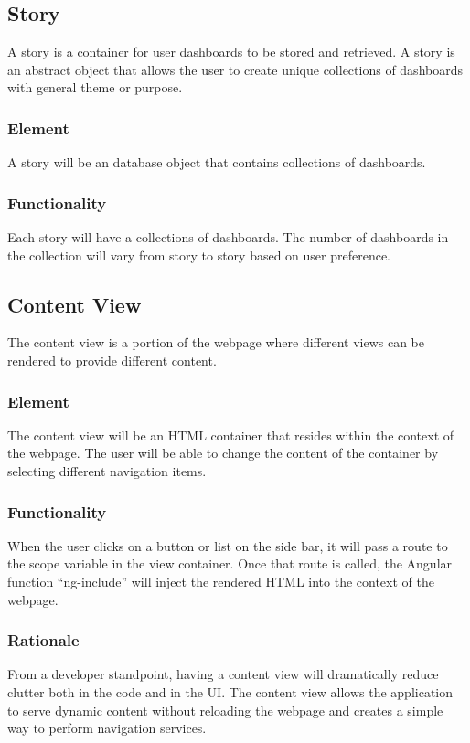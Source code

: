 \documentclass[journal,10pt,onecolumn,compsoc]{IEEEtran}
\begin{document}
			\subsection{Story}
			A story is a container for user dashboards to be stored and retrieved. A story is an abstract object that allows the user to create unique collections of dashboards with general theme or purpose.
			\subsubsection{Element}
				A story will be an database object that contains collections of dashboards.
			\subsubsection{Functionality}
				Each story will have a collections of dashboards. The number of dashboards in the collection will vary from story to story based on user preference.
		
		\subsection{Content View}
			The content view is a portion of the webpage where different views can be rendered to provide different content.
			\subsubsection{Element} 
				The content view will be an HTML container that resides within the context of the webpage. The user will be able to change the content of the container by selecting different navigation items.
			\subsubsection{Functionality}
				When the user clicks on a button or list on the side bar, it will pass a route to the scope variable in the view container. Once that route is called, the Angular function ``ng-include'' will inject the rendered HTML into the context of the webpage.
			\subsubsection{Rationale} 
				From a developer standpoint, having a content view will dramatically reduce clutter both in the code and in the UI. The content view allows the application to serve dynamic content without reloading the webpage and creates a simple way to perform navigation services.
\end{document}
